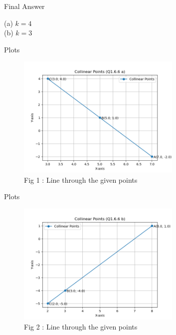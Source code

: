 \documentclass{beamer}
\numberwithin{equation}{section}
\theoremstyle{remark}
\begin{document}
\begin{frame}{Final Answer}

 (a) $k=4$ \\
 (b) $k=3$

\end{frame}

\begin{frame}{Plots}

\begin{figure}[h!]
\centering
\includegraphics[width=0.7\textwidth]{figs/fig_a.png}\hfill
\caption*{Fig 1 : Line through the given points}
\label{Fig 1}
\end{figure}

\end{frame}

\begin{frame}{Plots}

\begin{figure}[h!]
 \centering
  \includegraphics[width=0.7\textwidth]{figs/fig_b.png}
  \caption*{Fig 2 : Line through the given points}
  \label{Fig 2}
\end{figure}

\end{frame}
\end{document}
